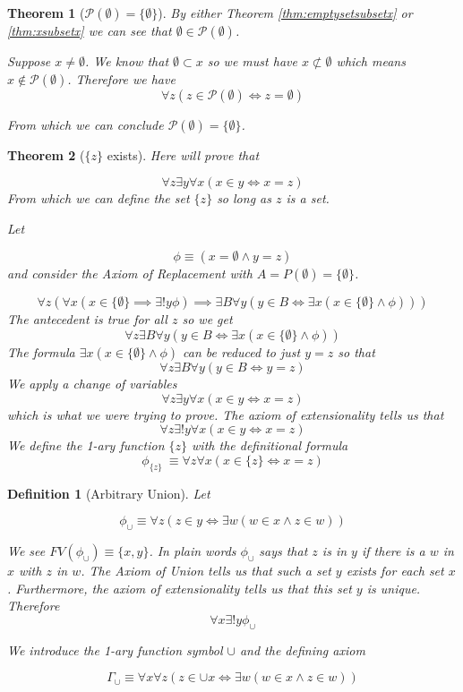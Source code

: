\documentclass[12pt]{article}
\theoremstyle{break}
\newtheorem{definition}{Definition}[section]
\theoremstyle{break}
\newtheorem{theorem}{Theorem}[section]
\theoremstyle{break}
\theoremstyle{break}
\theoremstyle{break}
\newtheorem{informal definition}[definition]{Informal Definition}
\begin{document}
\begin{theorem}[$\mathcal{P}(\emptyset) = \{\emptyset\}$]
By either Theorem \ref{thm:emptysetsubsetx} or \ref{thm:xsubsetx} we can see that $\emptyset \in \mathcal{P}(\emptyset)$.

Suppose $x \not = \emptyset$.
We know that $\emptyset \subset x$ so we must have $x\not\subset \emptyset$ which means $x\not \in \mathcal{P}(\emptyset)$.
Therefore we have
$$
\forall z (z\in \mathcal{P}(\emptyset) \iff z = \emptyset)
$$

From which we can conclude $\mathcal{P}(\emptyset) = \{\emptyset\}$.
\end{theorem}

\begin{theorem}[$\{z\}$ exists]
Here will prove that

$$
\forall z \exists y \forall x (x\in y \iff x = z)
$$
From which we can define the set $\{z\}$ so long as $z$ is a set.

Let

$$
\phi \equiv (x = \emptyset \land y = z)
$$
and consider the Axiom of Replacement with $A = P(\emptyset) = \{\emptyset\}$.

$$
\forall z(\forall x (x\in \{\emptyset\} \implies \exists!y \phi) \implies \exists B \forall y (y\in B \iff \exists x(x\in \{\emptyset\} \land\phi)))
$$
The antecedent is true for all $z$ so we get
$$
\forall z \exists B \forall y (y\in B \iff \exists x(x\in \{\emptyset\} \land \phi))
$$
The formula $\exists x (x\in \{\emptyset\} \land \phi)$ can be reduced to just $y=z$ so that
$$
\forall z \exists B \forall y(y\in B \iff y=z)
$$
We apply a change of variables
$$
\forall z \exists y \forall x (x\in y \iff x=z)
$$
which is what we were trying to prove.
The axiom of extensionality tells us that
$$
\forall z \exists!y \forall x(x\in y \iff x=z)
$$
We define the 1-ary function $\{z\}$ with the definitional formula
$$
\phi_{\{z\}}\ \equiv \forall z \forall x(x\in \{z\} \iff x=z)
$$

\end{theorem}

\begin{definition}[Arbitrary Union]
Let

$$
\phi_{\cup} \equiv \forall z(z\in y \iff \exists w(w\in x \land z \in w))
$$

We see $FV(\phi_{\cup}) \equiv \{x, y\}$.
In plain words $\phi_{\cup}$ says that $z$ is in $y$ if there is a $w$ in $x$ with $z$ in $w$.
The Axiom of Union tells us that such a set $y$ exists for each set $x$.
Furthermore, the axiom of extensionality tells us that this set $y$ is unique.
Therefore
$$
\forall x \exists! y \phi_{\cup}
$$

We introduce the 1-ary function symbol $\cup$ and the defining axiom

$$
\Gamma_{\cup} \equiv \forall x \forall z (z\in \cup x \iff \exists w(w\in x \land z \in w))
$$

\end{definition}
\end{document}
